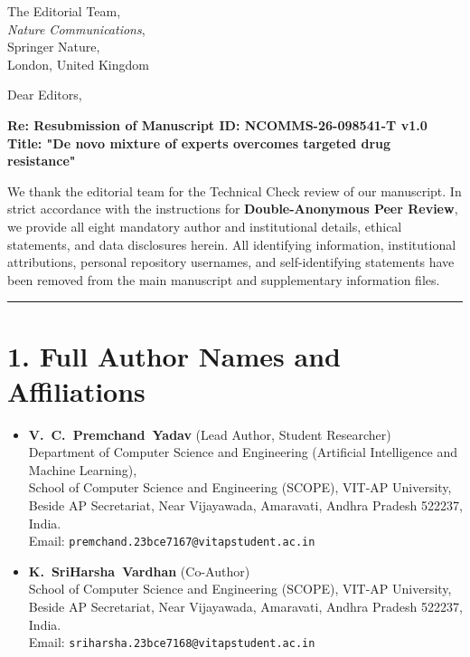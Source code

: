 \documentclass[11pt]{letter}
\begin{document}
\begin{letter}{%
    The Editorial Team,\\
    \textit{Nature Communications},\\
    Springer Nature,\\
    London, United Kingdom
}

\opening{Dear Editors,}

\textbf{Re: Resubmission of Manuscript ID: NCOMMS-26-098541-T v1.0}\\
\textbf{Title: "De novo mixture of experts overcomes targeted drug resistance"}

We thank the editorial team for the Technical Check review of our manuscript. In strict accordance with the instructions for \textbf{Double-Anonymous Peer Review}, we provide all eight mandatory author and institutional details, ethical statements, and data disclosures herein. All identifying information, institutional attributions, personal repository usernames, and self-identifying statements have been removed from the main manuscript and supplementary information files.

\vspace{0.5em}
\hrule
\vspace{0.5em}

\section*{1. Full Author Names and Affiliations}
\begin{itemize}\setlength{\itemsep}{0.6em}
    \item \textbf{V.~C.~Premchand~Yadav} (Lead Author, Student Researcher)\\
    Department of Computer Science and Engineering (Artificial Intelligence and Machine Learning),\\
    School of Computer Science and Engineering (SCOPE), VIT-AP University,\\
    Beside AP Secretariat, Near Vijayawada, Amaravati, Andhra Pradesh 522237, India.\\
    Email: \texttt{premchand.23bce7167@vitapstudent.ac.in}
    
    \item \textbf{K.~SriHarsha~Vardhan} (Co-Author)\\
    School of Computer Science and Engineering (SCOPE), VIT-AP University,\\
    Beside AP Secretariat, Near Vijayawada, Amaravati, Andhra Pradesh 522237, India.\\
    Email: \texttt{sriharsha.23bce7168@vitapstudent.ac.in}
    

\end{itemize}
\end{letter}
\end{document}
